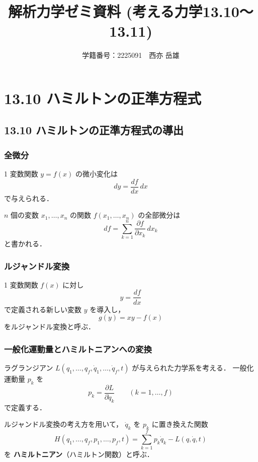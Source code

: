 \documentclass[a4paper,12pt]{jlreq}
\title{解析力学ゼミ資料 (考える力学13.10〜13.11)}
\author{学籍番号：2225091　西亦 岳雄}
\begin{document}
\maketitle




\section{13.10 ハミルトンの正準方程式}

\subsection*{13.10 ハミルトンの正準方程式の導出}

\subsubsection{全微分}
1 変数関数 $y = f(x)$ の微小変化は
\[
  dy = \frac{df}{dx}\,dx
\]
で与えられる．

$n$ 個の変数 $x_1,\dots,x_n$ の関数 $f(x_1,\dots,x_n)$ の全部微分は
\[
  df = \sum_{k=1}^n 
        \frac{\partial f}{\partial x_k}\,dx_k
\tag{13.128}
\]
と書かれる．

\subsubsection{ルジャンドル変換}
1 変数関数 $f(x)$ に対し
\[
  y = \frac{df}{dx}
\]
で定義される新しい変数 $y$ を導入し，
\[
  g(y) = xy - f(x)
\]
をルジャンドル変換と呼ぶ．



\subsubsection{一般化運動量とハミルトニアンへの変換}
ラグランジアン $L(q_1,\dots,q_f,\dot q_1,\dots,\dot q_f,t)$
が与えられた力学系を考える．
一般化運動量 $p_k$ を
\[
  p_k = \frac{\partial L}{\partial \dot q_k}
  \qquad (k=1,\dots,f)
\tag{13.133}
\]
で定義する．

ルジャンドル変換の考え方を用いて，
$\dot q_k$ を $p_k$ に置き換えた関数
\[
  H(q_1,\dots,q_f,p_1,\dots,p_f,t)
  = \sum_{k=1}^f p_k \dot q_k - L(q,\dot q,t)
\tag{13.138}
\]
を \textbf{ハミルトニアン}（ハミルトン関数）と呼ぶ．
\end{document}
